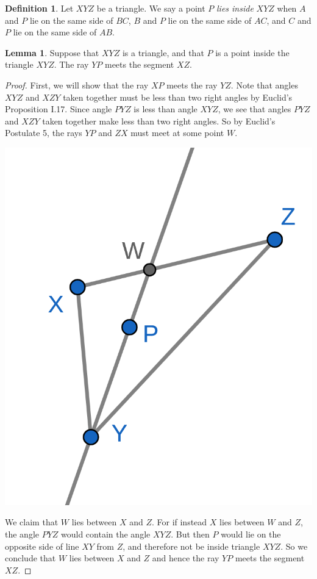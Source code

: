 \documentclass{tufte-handout}
\theoremstyle{definition}
\newtheorem{definition}[theorem]{Definition}
\newtheorem{lemma}[theorem]{Lemma}
\begin{document}
\begin{definition}
Let $XYZ$ be a triangle. We say a point $P$ \emph{lies inside} $XYZ$ when $A$ and $P$ lie on the same side of $BC$, $B$ and $P$ lie on the same side of $AC$, and $C$ and $P$ lie on the same side of $AB$.
\end{definition}


\begin{lemma}\label{lemma:lighthouse}
Suppose that $XYZ$ is a triangle, and that $P$ is a point inside the triangle $XYZ$. The ray $YP$ meets the segment $XZ$.
\end{lemma}

\begin{proof}
First, we will show that the ray $XP$ meets the ray $YZ$.
Note that angles $XYZ$ and $XZY$ taken together must be less than two right angles by Euclid's Proposition I.17. Since angle $PYZ$ is less than angle $XYZ$, we see that angles $PYZ$ and $XZY$ taken together make less than two right angles. So by Euclid's Postulate 5, the rays $YP$ and $ZX$ must meet at some point $W$.

\begin{marginfigure}
  \includegraphics{images/pasch_adjusted.png}
\end{marginfigure}


We claim that $W$ lies between $X$ and $Z$. For if instead $X$ lies between $W$ and $Z$, the angle $PYZ$ would contain the angle $XYZ$. But then $P$ would lie on the opposite side of line $XY$ from $Z$, and therefore not be inside triangle $XYZ$. So we conclude that $W$ lies between $X$ and $Z$ and hence the ray $YP$ meets the segment $XZ$.
\end{proof}
\end{document}

